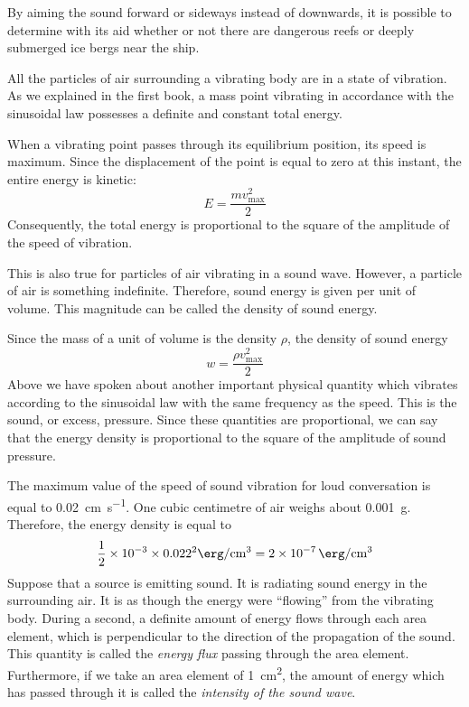 By aiming the sound forward or sideways instead of downwards, it is possible to determine with its aid whether or not there are dangerous reefs or deeply submerged ice­ bergs near the ship.

All the particles of air surrounding a vibrating body are in a state of vibration. As we explained in the first book, a mass point vibrating in accordance with the si­nusoidal law possesses a definite and constant total energy.

When a vibrating point passes through its equilibrium position, its speed is maximum. Since the displacement of the point is equal to zero at this instant, the entire energy is kinetic:
\begin{equation*}%
E = \frac{mv^{2}_{\textrm{max}}}{2}
\end{equation*}
Consequently, the total energy is proportional to the square of the amplitude of the speed of vibration.

This is also true for particles of air vibrating in a sound wave. However, a particle of air is something indefinite. Therefore, sound energy is given per unit of volume. This magnitude can be called the density of sound energy.

Since the mass of a unit of volume is the density $\rho$, the density of sound energy
\begin{equation*}%
w = \frac{\rho v^{2}_{\textrm{max}}}{2}
\end{equation*}
Above we have spoken about another important phys­ical quantity which vibrates according to the sinusoidal law with the same frequency as the speed. This is the sound, or excess, pressure. Since these quantities are proportional, we can say that the energy density is pro­portional to the square of the amplitude of sound pressure.

The maximum value of the speed of sound vibration for loud conversation is equal to \SI{0.02}{\centi\meter\per\second}. One cubic cen­timetre of air weighs about \SI{0.001}{\gram}. Therefore, the energy density is equal to
\begin{equation*}%
\frac{1}{2} \times \num{d-3} \times \num{0.022}^{2} \si{\erg\per\centi\meter\cubed} = \SI{2d-7}{\erg\per\centi\meter\cubed}
\end{equation*}
Suppose that a source is emitting sound. It is radiating sound energy in the surrounding air. It is as though the energy were ``flowing'' from the vibrating body. During a second, a definite amount of energy flows through each area element, which is perpendicular to the direction of the propagation of the sound. This quantity is called the \emph{energy flux} passing through the area element. Furthermore, if we take an area element of \SI{1}{\centi\meter\squared}, the amount of energy which has passed through it is called the \emph{intensity of the sound wave}.

